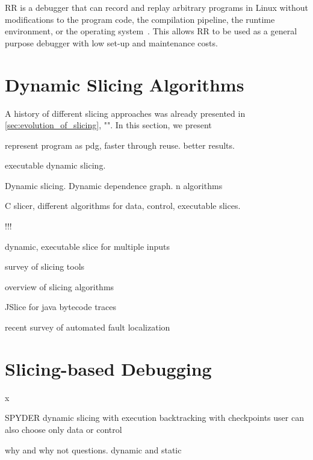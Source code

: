 RR is a debugger that can record and replay arbitrary programs in Linux without modifications to the program code, the compilation pipeline, the runtime environment, or the operating system~\cite{ocallahan17:engineering_record_and_replay}.
This allows RR to be used as a general purpose debugger with low set-up and maintenance costs.

\section{Dynamic Slicing Algorithms}
\label{sec:rw_dynamic_slicing}

A history of different slicing approaches was already presented in \cref{sec:evolution_of_slicing}, "".
In this section, we present


\cite{ottenstein84:the_program_dependence_graph}
represent program as pdg, faster through reuse. better results.

\cite{korel88:dynamic_program_slicing}
executable dynamic slicing.

\cite{agrawal90:dynamic_program_slicing}
Dynamic slicing. Dynamic dependence graph. n algorithms


\cite{venkatesh95:experimental_results_from_dynamic}
C slicer, different algorithms for data, control, executable slices.

\cite{venkatesh91:the_semantic_approach}!!!

\cite{hall95:automatic_extraction_of_executable}
dynamic, executable slice for multiple inputs

\cite{hoffner95:evaluation_and_comparison}
survey of slicing tools

\cite{korel98:dynamic_program_slicing_methods}
overview of slicing algorithms

\cite{wang08:dynamic_slicing_on_java}
JSlice for java bytecode traces

\cite{wong16:a_survey_on_software}
recent survey of automated fault localization


\section{Slicing-based Debugging}
\label{sec:rw_slice_debugging}
x
\newpage

\cite{agrawal93:debugging_with_dynamic_slicing}
SPYDER
dynamic slicing with execution backtracking with checkpoints
user can also choose only data or control

\cite{ko08:debugging_reinvented_asking}
why and why not questions. dynamic and static

